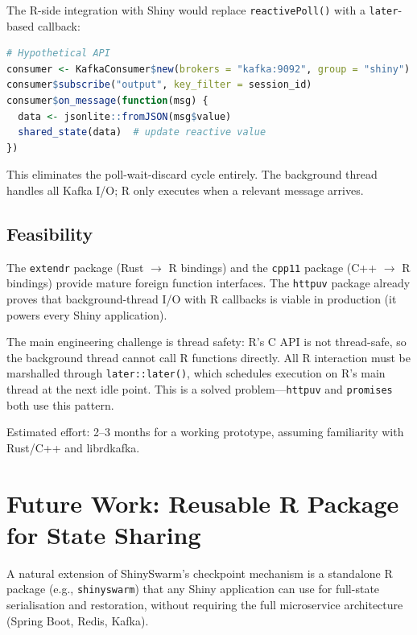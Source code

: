 \documentclass[11pt,a4paper]{article}
\begin{document}
The R-side integration with Shiny would replace \texttt{reactivePoll()}
with a \texttt{later}-based callback:

\begin{lstlisting}[language=R]
# Hypothetical API
consumer <- KafkaConsumer$new(brokers = "kafka:9092", group = "shiny")
consumer$subscribe("output", key_filter = session_id)
consumer$on_message(function(msg) {
  data <- jsonlite::fromJSON(msg$value)
  shared_state(data)  # update reactive value
})
\end{lstlisting}

This eliminates the poll-wait-discard cycle entirely. The background
thread handles all Kafka I/O; R only executes when a relevant message
arrives.

\subsection{Feasibility}

The \texttt{extendr} package (Rust $\to$ R bindings) and the
\texttt{cpp11} package (C++ $\to$ R bindings) provide mature foreign
function interfaces. The \texttt{httpuv} package already proves that
background-thread I/O with R callbacks is viable in production
(it powers every Shiny application).

The main engineering challenge is thread safety: R's C API is not
thread-safe, so the background thread cannot call R functions directly.
All R interaction must be marshalled through \texttt{later::later()},
which schedules execution on R's main thread at the next idle point.
This is a solved problem---\texttt{httpuv} and \texttt{promises} both
use this pattern.

Estimated effort: 2--3 months for a working prototype, assuming
familiarity with Rust/C++ and librdkafka.

\section{Future Work: Reusable R Package for State Sharing}

A natural extension of ShinySwarm's checkpoint mechanism is a standalone R package
(e.g., \texttt{shinyswarm}) that any Shiny application can use for full-state
serialisation and restoration, without requiring the full microservice architecture
(Spring Boot, Redis, Kafka).
\end{document}
